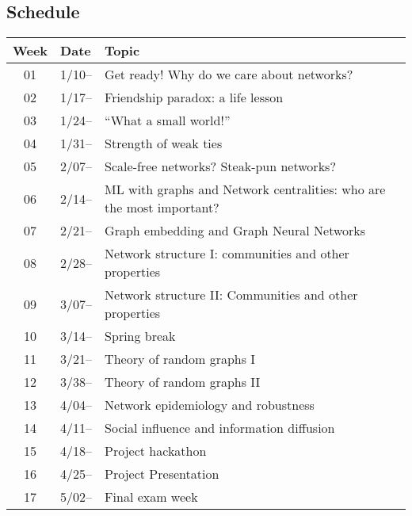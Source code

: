 \subsection{Schedule}\label{sub:schedule}%

\begin{tabular}{@{}cll@{}} \toprule
  Week & Date & Topic \\\midrule
  01 & 1/10-- & Get ready! Why do we care about networks? \\
  02 & 1/17-- & Friendship paradox: a life lesson \\
  03 & 1/24-- & ``What a small world!'' \\
  04 & 1/31-- & Strength of weak ties \\
  05 & 2/07-- & Scale-free networks? Steak-pun networks? \\
  06 & 2/14-- & ML with graphs and Network centralities: who are the most important? \\
  07 & 2/21-- & Graph embedding and Graph Neural Networks \\
  08 & 2/28-- & Network structure I: communities and other properties  \\
  09 & 3/07-- & Network structure II: Communities and other properties  \\
  10 & 3/14-- & Spring break \\
  11 & 3/21-- & Theory of random graphs I \\
  12 & 3/38-- & Theory of random graphs II \\
  13 & 4/04-- & Network epidemiology and robustness \\
  14 & 4/11-- & Social influence and information diffusion \\
  15 & 4/18-- & Project hackathon \\
  16 & 4/25-- & Project Presentation \\
  17 & 5/02-- & Final exam week \\
  \bottomrule
\end{tabular}


